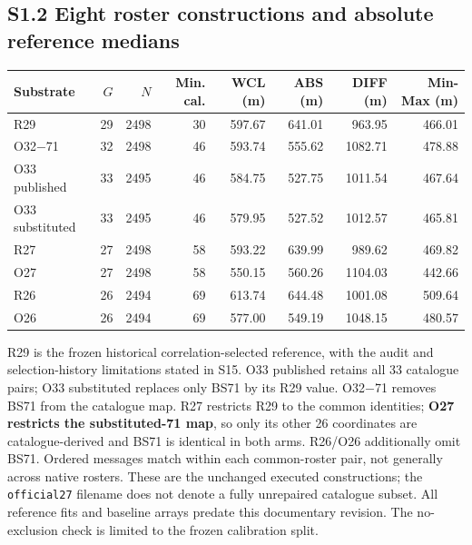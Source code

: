 \documentclass[journal,onecolumn,10pt]{IEEEtran}
\begin{document}
\subsection*{S1.2 Eight roster constructions and absolute reference medians}
\begin{center}\begin{minipage}{\textwidth}\centering\small
{}\label{tab:s-baselines}
\begin{tabular}{@{}lrrrrrrr@{}}
\toprule
Substrate & $G$ & $N$ & Min. cal. & WCL (m) & ABS (m) & DIFF (m) & Min-Max (m) \\
\midrule
R29 & 29 & 2498 & 30 & 597.67 & 641.01 & 963.95 & 466.01 \\
O32$-$71 & 32 & 2498 & 46 & 593.74 & 555.62 & 1082.71 & 478.88 \\
O33 published & 33 & 2495 & 46 & 584.75 & 527.75 & 1011.54 & 467.64 \\
O33 substituted & 33 & 2495 & 46 & 579.95 & 527.52 & 1012.57 & 465.81 \\
R27 & 27 & 2498 & 58 & 593.22 & 639.99 & 989.62 & 469.82 \\
O27 & 27 & 2498 & 58 & 550.15 & 560.26 & 1104.03 & 442.66 \\
R26 & 26 & 2494 & 69 & 613.74 & 644.48 & 1001.08 & 509.64 \\
O26 & 26 & 2494 & 69 & 577.00 & 549.19 & 1048.15 & 480.57 \\
\bottomrule
\end{tabular}
\end{minipage}\end{center}
R29 is the frozen historical correlation-selected reference, with the audit and selection-history limitations stated in S15. O33 published retains all 33 catalogue pairs; O33 substituted replaces only BS71 by its R29 value. O32$-$71 removes BS71 from the catalogue map. R27 restricts R29 to the common identities; \textbf{O27 restricts the substituted-71 map}, so only its other 26 coordinates are catalogue-derived and BS71 is identical in both arms. R26/O26 additionally omit BS71. Ordered messages match within each common-roster pair, not generally across native rosters. These are the unchanged executed constructions; the \texttt{official27} filename does not denote a fully unrepaired catalogue subset. All reference fits and baseline arrays predate this documentary revision. The no-exclusion check is limited to the frozen calibration split.
\end{document}
